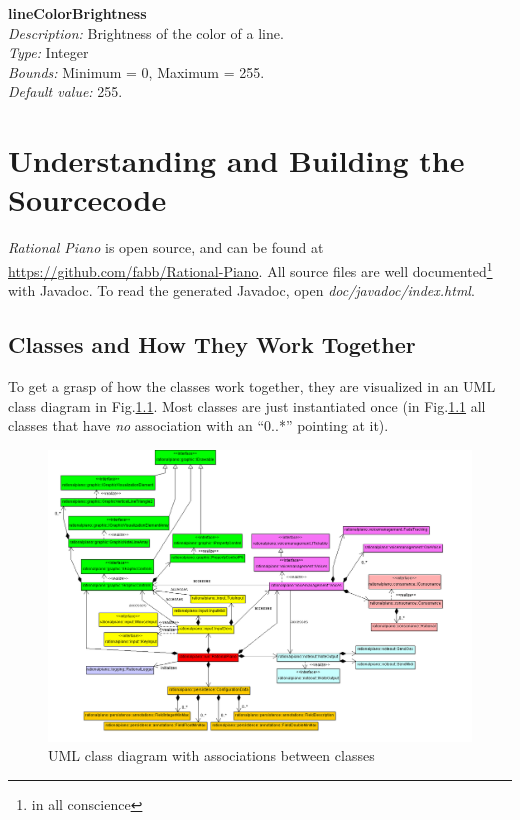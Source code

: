 \documentclass[12pt,a4paper,titlepage,oneside]{report}
\begin{document}
\noindent
\textbf{lineColorBrightness} \\
\emph{Description:} Brightness of the color of a line. \\
\emph{Type:} Integer \\
\emph{Bounds:} Minimum = 0, Maximum = 255. \\
\emph{Default value:} 255.


\chapter{Understanding and Building the Sourcecode}
\label{chap:source}

\emph{Rational Piano} is open source, and can be found at \url{https://github.com/fabb/Rational-Piano}. All source files are well documented\footnote{in all conscience} with Javadoc. To read the generated Javadoc, open \emph{doc/javadoc/index.html}.

\section{Classes and How They Work Together}

To get a grasp of how the classes work together, they are visualized in an UML class diagram in Fig.\ref{fig:interaction}. Most classes are just instantiated once (in Fig.\ref{fig:interaction} all classes that have \emph{no} association with an ``0..*'' pointing at it).

\begin{figure}[htbp]
\includegraphics[width=\textwidth]{images/uml_class_diagram/rational_piano_class_diagram.png}
\centering
\caption{UML class diagram with associations between classes}
\label{fig:interaction}
\end{figure}
\end{document}
